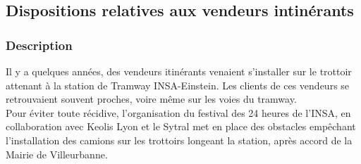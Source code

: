 \documentclass[hidelinks, paper=a4, fontsize=13pt]{report}
\begin{document}
\subsection{Dispositions relatives aux vendeurs intinérants}
\subsubsection{Description}

Il y a quelques années, des vendeurs itinérants venaient s’installer sur le trottoir attenant à la station de Tramway INSA-Einstein. Les clients de ces vendeurs se retrouvaient souvent proches, voire même sur les voies du tramway.  \\

Pour éviter toute récidive, l’organisation du festival des 24 heures de l’INSA, en collaboration avec Keolis Lyon et le Sytral met en place des obstacles empêchant l’installation des camions sur les trottoirs longeant la station, après accord de la Mairie de Villeurbanne. 
\end{document}

